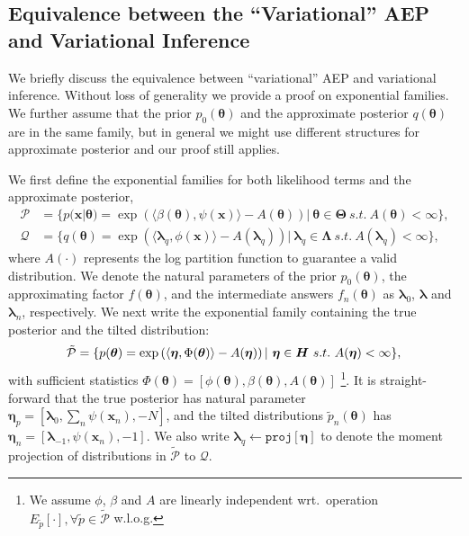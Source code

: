 \documentclass{article} %
\begin{document}
\subsection{Equivalence between the ``Variational'' AEP and Variational Inference}
We briefly discuss the equivalence between ``variational'' AEP and variational inference.  
%
Without loss of generality we provide a proof on exponential families. We further assume that the prior $p_0(\bm{\theta})$ and the approximate posterior $q(\bm{\theta})$ are in the same family, but in general we might use different structures for approximate posterior and our proof still applies. 

We first define the exponential families for both likelihood terms and the approximate posterior,
\begin{align}
\mathcal{P} &= \{p(\bm{x} | \bm{\theta}) = \exp \left( \langle \beta(\bm{\theta}), \psi(\bm{x}) \rangle - A(\bm{\theta}) \right) |\ \bm{\theta} \in \bm{\Theta} \ s.t.~ A(\bm{\theta}) < \infty \}, \\
\mathcal{Q} &= \{q(\bm{\theta}) = \exp \left( \langle \bm{\lambda}_q, \phi(\bm{x}) \rangle - A(\bm{\lambda}_q) \right) |\ \bm{\lambda}_q \in \bm{\Lambda} \ s.t.~ A(\bm{\lambda}_q) < \infty \},
\end{align}
where $A(\cdot)$ represents the log partition function to guarantee a valid distribution. We denote the natural parameters of the prior $p_0(\bm{\theta})$, the approximating factor $f(\bm{\theta})$, and the intermediate answers $f_n(\bm{\theta})$ as $\bm{\lambda}_0$, $\bm{\lambda}$ and $\bm{\lambda}_n$, respectively. We next write the exponential family containing the true posterior and the tilted distribution:
\begin{equation}
\mathcal{\tilde{P}} = \{p(\bm{\theta}) = \exp \left( \langle \bm{\eta}, \Phi(\bm{\theta}) \rangle - A(\bm{\eta}) \right) |\ \bm{\eta} \in \bm{H} \ s.t.~ A(\bm{\eta}) < \infty \}, \\
\end{equation}
with sufficient statistics $\Phi(\bm{\theta}) = [\phi(\bm{\theta}), \beta(\bm{\theta}), A(\bm{\theta})]$ \footnote{We assume $\phi$, $\beta$ and $A$ are linearly independent wrt.~operation $E_{\tilde{p}}[\cdot], \forall \tilde{p} \in \tilde{\mathcal{P}}$ w.l.o.g.}. It is straight-forward that the true posterior has natural parameter $\bm{\eta}_p = [\bm{\lambda}_0, \sum_{n} \psi(\bm{x}_n), -N]$, and the tilted distributions $\tilde{p}_n(\bm{\theta})$ has $\bm{\eta}_n = [\bm{\lambda}_{-1}, \psi(\bm{x}_n), -1]$. We also write $\bm{\lambda}_q \leftarrow \mathtt{proj}[\bm{\eta}]$ to denote the moment projection of distributions in $\mathcal{\tilde{P}}$ to $\mathcal{Q}$.
\end{document}
